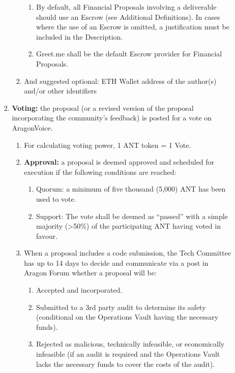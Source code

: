 \begin{enumerate}
\begin{enumerate}
\begin{enumerate}
\begin{enumerate}
				\begin{enumerate}
					\item By default, all Financial Proposals involving a deliverable should use an Escrow (see Additional Definitions).
					In cases where the use of an Escrow is omitted, a justification must be included in the Description.
					\item Greet.me shall be the default Escrow provider for Financial Proposals.
				\end{enumerate}
				\item And suggested optional: ETH Wallet address of the author(s) and/or other identifiers
			\end{enumerate}

			\item \textbf{Voting:} the proposal (or a revised version of the proposal incorporating the community’s feedback) is posted for a vote on \gls{AragonVoice}.
			\begin{enumerate}
				\item For calculating voting power, 1 \ac{ANT} token = 1 Vote.
				\item \textbf{Approval:} a proposal is deemed approved and scheduled for execution if the following conditions are reached:
				\begin{enumerate}
					\item Quorum: a minimum of five thousand (5,000) \ac{ANT} has
					been used to vote.
					\item  Support: The vote shall be deemed as “passed” with a
					simple majority (>50\%) of the participating \ac{ANT} having
					voted in favour.
				\end{enumerate}
	
				\item When a proposal includes a code submission, the Tech Committee has up to 14 days to decide and communicate via a post in Aragon Forum whether a proposal will be:
				\begin{enumerate}
					\item Accepted and incorporated.
					\item Submitted to a 3rd party audit to determine its safety
					(conditional on the Operations Vault having the necessary
					funds).
					\item Rejected as malicious, technically infeasible, or
					economically infeasible (if an audit is required and the Operations Vault lacks the necessary funds to cover the costs of the audit).
				\end{enumerate}
			\end{enumerate}
		\end{enumerate}
		

\end{enumerate}
\end{enumerate}
